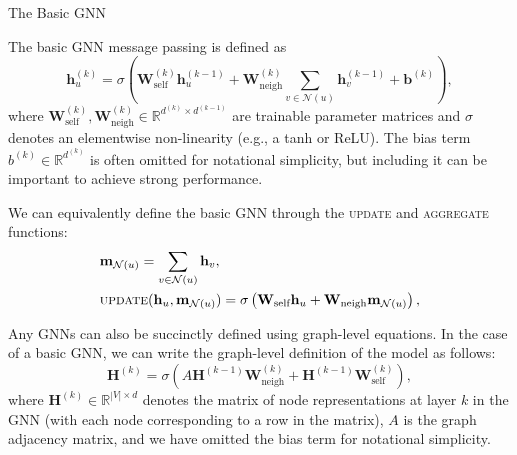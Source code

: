 \documentclass[10pt, aspectratio=169, compress, protectframetitle, handout]{beamer}
\begin{document}
\begin{frame}{The Basic GNN}

    The basic GNN message passing is defined as
    \begin{equation}
        \mathbf h^{(k)}_u = \sigma \left( \mathbf W^{(k)}_\text{self} \mathbf h_u^{(k-1)} + \mathbf W_\text{neigh}^{(k)} \sum_{v \in \mathcal N(u)} \mathbf h^{(k-1)}_v + \mathbf b^{(k)} \right),
    \end{equation}
    where $\mathbf W^{(k)}_\text{self}, \mathbf W_\text{neigh}^{(k)} \in \mathbb R^{d^{(k)} \times d^{(k-1)}}$ are trainable parameter matrices and $\sigma$ denotes an elementwise non-linearity (e.g., a tanh or ReLU). The bias term $b^{(k)} \in \mathbb R^{d^{(k)}}$ is often omitted for notational simplicity, but including it can be important to achieve strong performance.
    
    We can equivalently define the basic GNN through the \textsc{update} and \textsc{aggregate} functions:
    \begin{align}
        &\mathbf m_{\mathcal N(u)} = \sum_{v \in \mathcal N(u)} \mathbf h_v, 
        \label{eq:basicgnn} \\
        &\textsc{update}(\mathbf h_u, \mathbf m_{\mathcal N(u)}) = \sigma \left( \mathbf W_\text{self} \mathbf h_u + \mathbf W_\text{neigh} \mathbf m_{\mathcal N(u)} \right),
    \end{align}
    
    Any GNNs can also be succinctly defined using graph-level equations. In the case of a basic GNN, we can write the graph-level definition of the model as follows:
    \begin{equation}
        \mathbf H^{(k)} = \sigma \left( A \mathbf H^{(k-1)} \mathbf W_\text{neigh}^{(k)} + \mathbf H^{(k-1)} \mathbf W_\text{self}^{(k)} \right),
    \end{equation}
    where $\mathbf H^{(k)} \in \mathbb R^{|V| \times d}$ denotes the matrix of node representations at layer $k$ in the GNN (with each node corresponding to a row in the matrix), $A$ is the graph adjacency matrix, and we have omitted the bias term for notational simplicity.
    
\end{frame}
\end{document}

